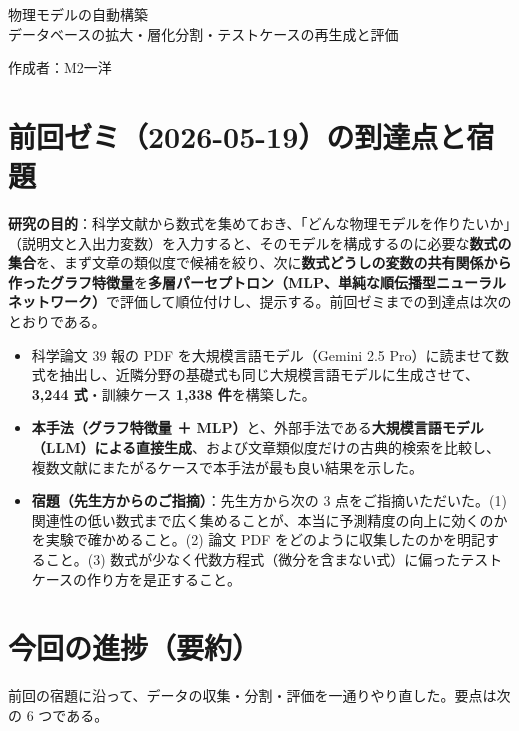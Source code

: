 \documentclass[a4j,dvipdfmx,12pt]{jresume}
\begin{document}

\medskip
\begin{center}
  {\Large 物理モデルの自動構築\\
  データベースの拡大・層化分割・テストケースの再生成と評価}
\end{center}

\begin{flushright}
作成者：M2\quad 一洋
\end{flushright}
\medskip

\section{前回ゼミ（2026-05-19）の到達点と宿題}
\textbf{研究の目的}：科学文献から数式を集めておき、「どんな物理モデルを作りたいか」（説明文と入出力変数）を入力すると、そのモデルを構成するのに必要な\textbf{数式の集合}を、まず文章の類似度で候補を絞り、次に\textbf{数式どうしの変数の共有関係から作ったグラフ特徴量}を\textbf{多層パーセプトロン（MLP、単純な順伝播型ニューラルネットワーク）}で評価して順位付けし、提示する。前回ゼミまでの到達点は次のとおりである。

\begin{itemize}[leftmargin=1.5em]
  \item 科学論文 39 報の PDF を大規模言語モデル（Gemini 2.5 Pro）に読ませて数式を抽出し、近隣分野の基礎式も同じ大規模言語モデルに生成させて、\textbf{3{,}244 式}・訓練ケース \textbf{1{,}338 件}を構築した。
  \item \textbf{本手法（グラフ特徴量 ＋ MLP）}と、外部手法である\textbf{大規模言語モデル（LLM）による直接生成}、および文章類似度だけの古典的検索を比較し、複数文献にまたがるケースで本手法が最も良い結果を示した。
  \item \textbf{宿題（先生方からのご指摘）}：先生方から次の 3 点をご指摘いただいた。(1) 関連性の低い数式まで広く集めることが、本当に予測精度の向上に効くのかを実験で確かめること。(2) 論文 PDF をどのように収集したのかを明記すること。(3) 数式が少なく代数方程式（微分を含まない式）に偏ったテストケースの作り方を是正すること。
\end{itemize}

\section{今回の進捗（要約）}
前回の宿題に沿って、データの収集・分割・評価を一通りやり直した。要点は次の 6 つである。
\end{document}
